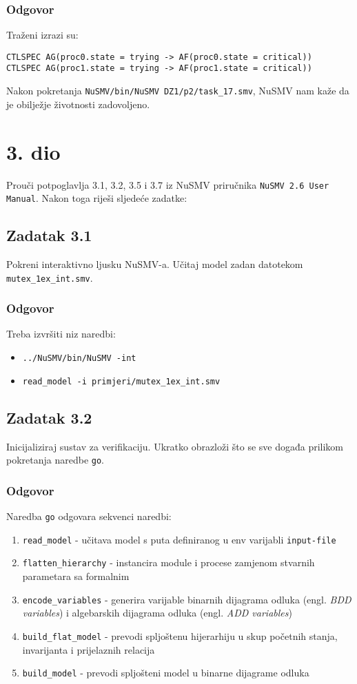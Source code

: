 \documentclass{article}
\newcommand{\code}[1]{\colorbox{blue!15}{\texttt{#1}}}
\newcommand{\odgovor}{\subsubsection*{Odgovor}}
\newcommand{\zadatak}[1]{\subsection{Zadatak #1}}
\begin{document}
\odgovor

Traženi izrazi su:

\begin{verbatim}
CTLSPEC AG(proc0.state = trying -> AF(proc0.state = critical))
CTLSPEC AG(proc1.state = trying -> AF(proc1.state = critical))
\end{verbatim}

\noindent
Nakon pokretanja \code{NuSMV/bin/NuSMV DZ1/p2/task\_17.smv}, NuSMV nam kaže da je obilježje životnosti zadovoljeno.
\pagebreak


\section{3. dio}

Prouči potpoglavlja 3.1, 3.2, 3.5 i 3.7 iz NuSMV priručnika \code{NuSMV 2.6 User Manual}. Nakon toga riješi sljedeće zadatke:

\zadatak{3.1}

Pokreni interaktivno ljusku NuSMV-a. Učitaj model zadan datotekom \code{mutex\_1ex\_int.smv}.

\odgovor

Treba izvršiti niz naredbi:

\begin{itemize}
    \item \code{../NuSMV/bin/NuSMV -int}
    \item \code{read\_model -i primjeri/mutex\_1ex\_int.smv}
\end{itemize}


\zadatak{3.2}

Inicijaliziraj sustav za verifikaciju. Ukratko obrazloži što se sve događa prilikom pokretanja naredbe \code{go}.

\odgovor

Naredba \code{go} odgovara sekvenci naredbi:

\begin{enumerate}
    \item \code{read\_model} - učitava model s puta definiranog u env varijabli \code{input-file}
    \item \code{flatten\_hierarchy} - instancira module i procese zamjenom stvarnih parametara sa formalnim
    \item \code{encode\_variables} - generira varijable binarnih dijagrama odluka (engl. \textit{BDD variables}) i algebarskih dijagrama odluka (engl. \textit{ADD variables})
    \item \code{build\_flat\_model} - prevodi spljoštenu hijerarhiju u skup početnih stanja, invarijanta i prijelaznih relacija
    \item \code{build\_model} - prevodi spljošteni model u binarne dijagrame odluka
\end{enumerate}
\end{document}
